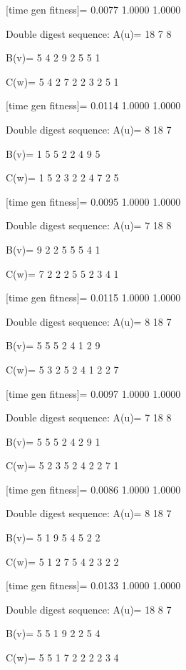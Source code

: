 [time gen fitness]=
    0.0077    1.0000    1.0000

Double digest sequence:
A(u)=
    18     7     8

B(v)=
     5     4     2     9     2     5     5     1

C(w)=
     5     4     2     7     2     2     3     2     5     1

[time gen fitness]=
    0.0114    1.0000    1.0000

Double digest sequence:
A(u)=
     8    18     7

B(v)=
     1     5     5     2     2     4     9     5

C(w)=
     1     5     2     3     2     2     4     7     2     5

[time gen fitness]=
    0.0095    1.0000    1.0000

Double digest sequence:
A(u)=
     7    18     8

B(v)=
     9     2     2     5     5     5     4     1

C(w)=
     7     2     2     2     5     5     2     3     4     1

[time gen fitness]=
    0.0115    1.0000    1.0000

Double digest sequence:
A(u)=
     8    18     7

B(v)=
     5     5     5     2     4     1     2     9

C(w)=
     5     3     2     5     2     4     1     2     2     7

[time gen fitness]=
    0.0097    1.0000    1.0000

Double digest sequence:
A(u)=
     7    18     8

B(v)=
     5     5     5     2     4     2     9     1

C(w)=
     5     2     3     5     2     4     2     2     7     1

[time gen fitness]=
    0.0086    1.0000    1.0000

Double digest sequence:
A(u)=
     8    18     7

B(v)=
     5     1     9     5     4     5     2     2

C(w)=
     5     1     2     7     5     4     2     3     2     2

[time gen fitness]=
    0.0133    1.0000    1.0000

Double digest sequence:
A(u)=
    18     8     7

B(v)=
     5     5     1     9     2     2     5     4

C(w)=
     5     5     1     7     2     2     2     2     3     4

